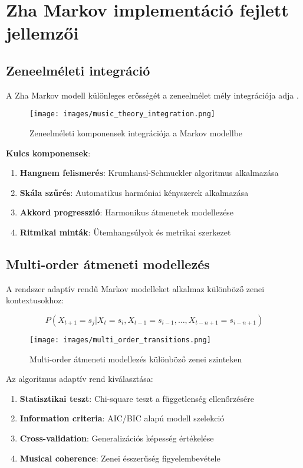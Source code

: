 \section{Zha Markov implementáció fejlett jellemzői}

\subsection{Zeneelméleti integráció}
A Zha Markov modell különleges erősségét a zeneelmélet mély integrációja adja \cite{carvalho2019markov}.

\begin{figure}[h]
\centering
\texttt{[image: images/music\_theory\_integration.png]}
\caption{Zeneelméleti komponensek integrációja a Markov modellbe}
\label{fig:music_theory}
\end{figure}

\textbf{Kulcs komponensek}:
\begin{enumerate}
\item \textbf{Hangnem felismerés}: Krumhansl-Schmuckler algoritmus alkalmazása
\item \textbf{Skála szűrés}: Automatikus harmóniai kényszerek alkalmazása
\item \textbf{Akkord progresszió}: Harmonikus átmenetek modellezése
\item \textbf{Ritmikai minták}: Ütemhangsúlyok és metrikai szerkezet
\end{enumerate}

\subsection{Multi-order átmeneti modellezés}
A rendszer adaptív rendű Markov modelleket alkalmaz különböző zenei kontextusokhoz:

\[
P(X_{t+1} = s_j | X_t = s_i, X_{t-1} = s_{i-1}, \ldots, X_{t-n+1} = s_{i-n+1})
\]

\begin{figure}[h]
\centering
\texttt{[image: images/multi\_order\_transitions.png]}
\caption{Multi-order átmeneti modellezés különböző zenei szinteken}
\label{fig:multi_order}
\end{figure}

Az algoritmus adaptív rend kiválasztása:
\begin{enumerate}
\item \textbf{Statisztikai teszt}: Chi-square teszt a függetlenség ellenőrzésére
\item \textbf{Information criteria}: AIC/BIC alapú modell szelekció
\item \textbf{Cross-validation}: Generalizációs képesség értékelése
\item \textbf{Musical coherence}: Zenei ésszerűség figyelembevétele
\end{enumerate}

